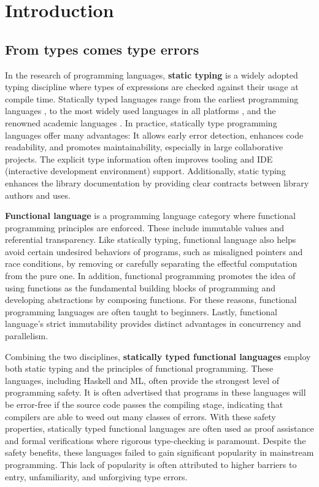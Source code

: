 
\chapter{Introduction}

\label{intro} 

\graphicspath{{Figures/Introduction}}

\section{From types comes type errors}

In the research of programming languages, \textbf{static typing} is a widely adopted typing discipline where types of expressions are checked against their usage at compile time. Statically typed languages range from the earliest programming languages \cite{Backus1978-xt}, to the most widely used languages in all platforms \cite{Ritchie1978-pa}, and the renowned academic languages \cite{Hudak2007-kn}. In practice, statically type programming languages offer many advantages: It allows early error detection, enhances code readability, and promotes maintainability, especially in large collaborative projects. The explicit type information often improves tooling and IDE (interactive development environment) support. Additionally, static typing enhances the library documentation by providing clear contracts between library authors and uses.

\textbf{Functional language} is a programming language category where functional programming principles are enforced. These include immutable values and referential transparency. Like statically typing, functional language also helps avoid certain undesired behaviors of programs, such as misaligned pointers and race conditions, by removing or carefully separating the effectful computation from the pure one. In addition, functional programming promotes the idea of using functions as the fundamental building blocks of programming and developing abstractions by composing functions. For these reasons, functional programming languages are often taught to beginners. Lastly, functional language's strict immutability provides distinct advantages in concurrency and parallelism.

Combining the two disciplines, \textbf{statically typed functional languages} employ both static typing and the principles of functional programming. These languages, including Haskell and ML, often provide the strongest level of programming safety. It is often advertised that programs in these languages will be error-free if the source code passes the compiling stage, indicating that compilers are able to weed out many classes of errors. With these safety properties, statically typed functional languages are often used as proof assistance and formal verifications where rigorous type-checking is paramount. Despite the safety benefits, these languages failed to gain significant popularity in mainstream programming. This lack of popularity is often attributed to higher barriers to entry, unfamiliarity, and unforgiving type errors.

